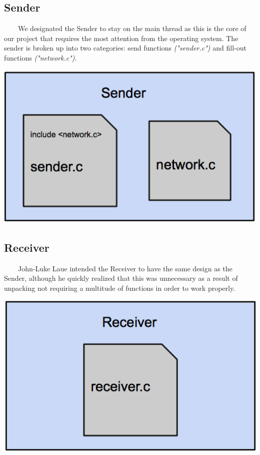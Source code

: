 \documentclass[11pt]{article}
\begin{document}
\subsection{Sender}
\ \ \ \ We designated the Sender to stay on the main thread as this is the core of our project that requires the most attention from the operating system. The sender is broken up into two categories: send functions \textit{("sender.c")} and fill-out functions \textit{("network.c")}. \\
\begin{center}
\includegraphics[scale=0.3]{images/sender-design.png}
\end{center}

\subsection{Receiver}
\ \ \ \ John-Luke Laue intended the Receiver to have the same design as the Sender, although he quickly realized that this was unnecessary as a result of unpacking not requiring a multitude of functions in order to work properly.
\begin{center}
\includegraphics[scale=0.3]{images/receiver-design.png}
\end{center}
\end{document}
